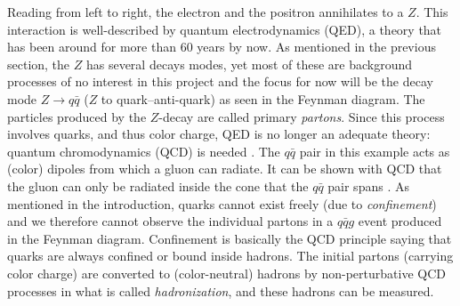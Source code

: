 Reading from left to right, the electron and the positron annihilates to a $Z$. This interaction is well-described by quantum electrodynamics (QED), a theory that has been around for more than 60 years by now. As mentioned in the previous section, the $Z$ has several decays modes, yet most of these are background processes of no interest in this project and the focus for now will be the decay mode $Z \rightarrow q\bar{q}$ ($Z$ to quark--anti-quark) as seen in the Feynman diagram. The particles produced by the $Z$-decay are called primary \emph{partons}. Since this process involves quarks, and thus color charge, QED is no longer an adequate theory: quantum chromodynamics (QCD) is needed \autocite{Armstrong1998hy}. The $q\bar{q}$ pair in this example acts as (color) dipoles from which a gluon can radiate. It can be shown with QCD that the gluon can only be radiated inside the cone that the $q\bar{q}$ pair spans \autocite{bierlichRopeHadronizationGeometry2016}. As mentioned in the introduction, quarks cannot exist freely (due to \emph{confinement}) and we therefore cannot observe the individual partons in a $q\bar{q}g$ event produced in the Feynman diagram. Confinement is basically the QCD principle saying that quarks are always confined or bound inside hadrons. The initial partons (carrying color charge) are converted to (color-neutral) hadrons by non-perturbative QCD processes in what is called \emph{hadronization}, and these hadrons can be measured. 

